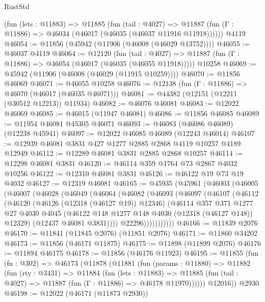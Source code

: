 \begin{lexlean}{RustStd}
\begin{coremodule}
    (fun (lets : @11883) =>
    @11885
      (fun (tail : @4027) =>
      @11887 (fun (Γ : @11886) => @46034 (@46017 (@46035 (@46037 @11916 @11918))))))
    @4119
@46054 := @11856 (@45942 (@11906 (@46008 (@46029 @13752))))
@46055 := @46037 @4119
@46064 := @12120
    (fun (tail : @4027) => @11887 (fun (Γ : @11886) => @46054 (@46017 (@46035 (@46055 @11918)))))
    @10258
@46069 := @45942 (@11906 (@46008 (@46029 (@11915 @10259))))
@46070 := @11856 @46069
@46071 := @46055 @10258
@46076 := @12138 (fun (Γ : @11886) => @46070 (@46017 (@46035 @46071)))
@46081 := @44382 (@12151 (@12211 (@30512 @12213)) @11934)
@46082 := @46076 @46081
@46083 := @12022 @46069
@46085 := @46015 (@11947 @46081)
@46086 := @11856 @46085
@46089 := @11954 @46081 @45305 @46071
@46093 := @46083 (@46086 @46089) (@12238 @45941)
@46097 := @12022 @46085 @46089 (@12243 @46014)
@46107 := @12939 @46081 @3831 @427 @1277 @2885 @2868 @4119 @10257 @4189 @12949
@46112 := @12289 @46081 @3831 @2885 @2868 @10257
@46114 := @12298 @46081 @3831
@46120 := @46114 @359 @1764 @73 @2867 @4032 @10256
@46122 := @12310 @46081 @3831
@46126 := @46122 @19 @73 @19 @4032
@46127 := @12319 @46081
@46165 := @45935
    (@45961
      (@46003
        (@46005
          (@46007
            (@46028
              (@46049
                (@46064
                  (@46082
                    (@46093
                      (@46097
                        (@46107
                          (@46112
                            (@46120
                              (@46126 (@12318 (@46127 @19)) @12346)
                              (@46114
                                @357
                                @371
                                @1277
                                @27
                                @4030
                                @4045
                                (@46122 @148 @1277 @148 @4030 (@12318 (@46127 @148)) @12329)
                                (@12437 @46081 @3831))))
                          @22296)))))))))))
@46166 := @11839 @2076
@46170 := @11841 (@11845 @2076) (@11851 @2076)
@46171 := @11860 @34202
@46173 := @11856 (@46171 @11875)
@46175 := @11898 (@11899 @2076)
@46176 := @11894 @46175
@46178 := @11856 (@46176 @11923)
@46195 := @11855
    (fun (fn : @302) =>
    @46173
      (@11878
        (@11881
          (fun (params : @11880) =>
          @11882
            (fun (rty : @3431) =>
            @11884
              (fun (lets : @11883) =>
              @11885 (fun (tail : @4027) => @11887 (fun (Γ : @11886) => @46178 @11970))))))
        @12016))
    @2930
@46198 := @12022 (@46171 (@11873 @2930))

\end{coremodule}
\end{lexlean}
